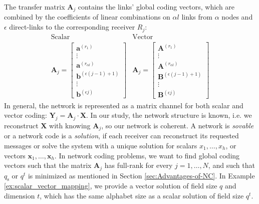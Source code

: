 The transfer matrix $\boldsymbol{A}_{j}$ contains the links' global
coding vectors, which are combined by the coefficients of linear combinations
on $\alpha l$ links from $\alpha$ nodes and $\epsilon$ direct-links
to the corresponding receiver $R_{j}$:
\[
\begin{array}{c|c}
\mathrm{Scalar} & \mathrm{Vector}\\
\boldsymbol{A}_{j}=\left[\begin{array}{c}
\boldsymbol{a}^{\left(r_{1}\right)}\\
\vdots\\
\boldsymbol{a}^{\left(r_{\alpha l}\right)}\\
\boldsymbol{b}^{\left(\epsilon\left(j-1\right)+1\right)}\\
\vdots\\
\boldsymbol{b}^{\left(\epsilon j\right)}
\end{array}\right] & \boldsymbol{A}_{j}=\left[\begin{array}{c}
\boldsymbol{A}^{\left(r_{1}\right)}\\
\vdots\\
\boldsymbol{A}^{\left(r_{\alpha l}\right)}\\
\boldsymbol{B}^{\left(\epsilon\left(j-1\right)+1\right)}\\
\vdots\\
\boldsymbol{B}^{\left(\epsilon j\right)}
\end{array}\right]
\end{array}
\]
In general, the network is represented as a matrix channel for both
scalar and vector coding: $\boldsymbol{Y}_{j}=\boldsymbol{A}_{j}\cdot\boldsymbol{X}$.
In our study, the network structure is known, i.e. we reconstruct
$\boldsymbol{X}$ with knowing $\boldsymbol{A}_{j}$, so our network
is coherent. A network is \textit{sovable} or a network code is a
\textit{solution}, if each receiver can reconstruct its requested
messages or solve the system with a unique solution for scalars $x_{1},\ldots,x_{h}$,
or vectors $\boldsymbol{x}_{1},\ldots,\boldsymbol{x}_{h}$. In network
coding problems, we want to find global coding vectors such that the
matrix $\boldsymbol{A}_{j}$ has full-rank for every $j=1,\ldots,N$,
and such that $q_{\mathrm{s}}$ or $q^{t}$ is minimized as mentioned
in Section \ref{sec:Advantages-of-NC}. In Example \ref{ex:scalar_vector_mapping},
we provide a vector solution of field size $q$ and dimension $t$,
which has the same alphabet size as a scalar solution of field size
$q^{t}$.

